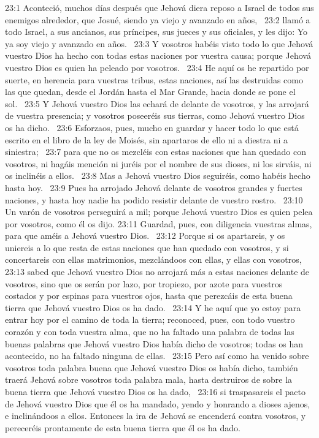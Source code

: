 23:1 Aconteció, muchos días después que Jehová diera reposo a Israel de todos sus enemigos alrededor, que Josué, siendo ya viejo y avanzado en años,  
23:2 llamó a todo Israel, a sus ancianos, sus príncipes, sus jueces y sus oficiales, y les dijo: Yo ya soy viejo y avanzado en años.  
23:3 Y vosotros habéis visto todo lo que Jehová vuestro Dios ha hecho con todas estas naciones por vuestra causa; porque Jehová vuestro Dios es quien ha peleado por vosotros.  
23:4 He aquí os he repartido por suerte, en herencia para vuestras tribus, estas naciones, así las destruidas como las que quedan, desde el Jordán hasta el Mar Grande, hacia donde se pone el sol.  
23:5 Y Jehová vuestro Dios las echará de delante de vosotros, y las arrojará de vuestra presencia; y vosotros poseeréis sus tierras, como Jehová vuestro Dios os ha dicho.  
23:6 Esforzaos, pues, mucho en guardar y hacer todo lo que está escrito en el libro de la ley de Moisés, sin apartaros de ello ni a diestra ni a siniestra;  
23:7 para que no os mezcléis con estas naciones que han quedado con vosotros, ni hagáis mención ni juréis por el nombre de sus dioses, ni los sirváis, ni os inclinéis a ellos.  
23:8 Mas a Jehová vuestro Dios seguiréis, como habéis hecho hasta hoy.  
23:9 Pues ha arrojado Jehová delante de vosotros grandes y fuertes naciones, y hasta hoy nadie ha podido resistir delante de vuestro rostro.  
23:10 Un varón de vosotros perseguirá a mil; porque Jehová vuestro Dios es quien pelea por vosotros, como él os dijo. 
23:11 Guardad, pues, con diligencia vuestras almas, para que améis a Jehová vuestro Dios.  
23:12 Porque si os apartareis, y os uniereis a lo que resta de estas naciones que han quedado con vosotros, y si concertareis con ellas matrimonios, mezclándoos con ellas, y ellas con vosotros,  
23:13 sabed que Jehová vuestro Dios no arrojará más a estas naciones delante de vosotros, sino que os serán por lazo, por tropiezo, por azote para vuestros costados y por espinas para vuestros ojos, hasta que perezcáis de esta buena tierra que Jehová vuestro Dios os ha dado.  
23:14 Y he aquí que yo estoy para entrar hoy por el camino de toda la tierra; reconoced, pues, con todo vuestro corazón y con toda vuestra alma, que no ha faltado una palabra de todas las buenas palabras que Jehová vuestro Dios había dicho de vosotros; todas os han acontecido, no ha faltado ninguna de ellas.  
23:15 Pero así como ha venido sobre vosotros toda palabra buena que Jehová vuestro Dios os había dicho, también traerá Jehová sobre vosotros toda palabra mala, hasta destruiros de sobre la buena tierra que Jehová vuestro Dios os ha dado,  
23:16 si traspasareis el pacto de Jehová vuestro Dios que él os ha mandado, yendo y honrando a dioses ajenos, e inclinándoos a ellos. Entonces la ira de Jehová se encenderá contra vosotros, y pereceréis prontamente de esta buena tierra que él os ha dado.  

